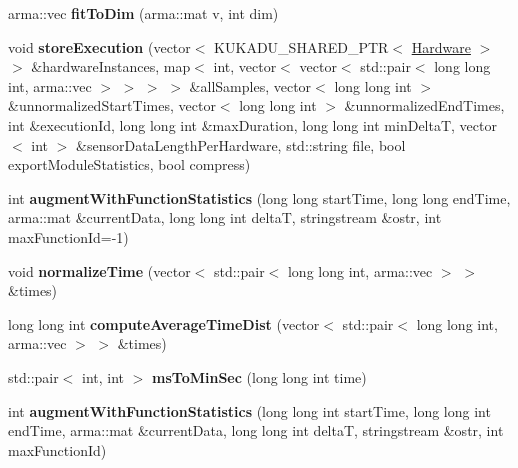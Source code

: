 \begin{DoxyCompactItemize}
\item 
arma\+::vec {\bfseries fit\+To\+Dim} (arma\+::mat v, int dim)\hypertarget{namespacekukadu_a5f6f7e69f2cdaa68555f7ed4783a5202}{}\label{namespacekukadu_a5f6f7e69f2cdaa68555f7ed4783a5202}

\item 
void {\bfseries store\+Execution} (vector$<$ K\+U\+K\+A\+D\+U\+\_\+\+S\+H\+A\+R\+E\+D\+\_\+\+P\+TR$<$ \hyperlink{classkukadu_1_1Hardware}{Hardware} $>$ $>$ \&hardware\+Instances, map$<$ int, vector$<$ vector$<$ std\+::pair$<$ long long int, arma\+::vec $>$ $>$ $>$ $>$ \&all\+Samples, vector$<$ long long int $>$ \&unnormalized\+Start\+Times, vector$<$ long long int $>$ \&unnormalized\+End\+Times, int \&execution\+Id, long long int \&max\+Duration, long long int min\+DeltaT, vector$<$ int $>$ \&sensor\+Data\+Length\+Per\+Hardware, std\+::string file, bool export\+Module\+Statistics, bool compress)\hypertarget{namespacekukadu_a7da4063c7c4cd7269933b7e80b5033cb}{}\label{namespacekukadu_a7da4063c7c4cd7269933b7e80b5033cb}

\item 
int {\bfseries augment\+With\+Function\+Statistics} (long long start\+Time, long long end\+Time, arma\+::mat \&current\+Data, long long int deltaT, stringstream \&ostr, int max\+Function\+Id=-\/1)\hypertarget{namespacekukadu_ae2a7dac6aa13b50ac97ce2cd34214362}{}\label{namespacekukadu_ae2a7dac6aa13b50ac97ce2cd34214362}

\item 
void {\bfseries normalize\+Time} (vector$<$ std\+::pair$<$ long long int, arma\+::vec $>$ $>$ \&times)\hypertarget{namespacekukadu_a0c363a082151911064bbd0c4a112bbc4}{}\label{namespacekukadu_a0c363a082151911064bbd0c4a112bbc4}

\item 
long long int {\bfseries compute\+Average\+Time\+Dist} (vector$<$ std\+::pair$<$ long long int, arma\+::vec $>$ $>$ \&times)\hypertarget{namespacekukadu_a4eed4286a6fb218c309d34381ca553a3}{}\label{namespacekukadu_a4eed4286a6fb218c309d34381ca553a3}

\item 
std\+::pair$<$ int, int $>$ {\bfseries ms\+To\+Min\+Sec} (long long int time)\hypertarget{namespacekukadu_a07941c44a11c11831024022d1e6b403c}{}\label{namespacekukadu_a07941c44a11c11831024022d1e6b403c}

\item 
int {\bfseries augment\+With\+Function\+Statistics} (long long int start\+Time, long long int end\+Time, arma\+::mat \&current\+Data, long long int deltaT, stringstream \&ostr, int max\+Function\+Id)\hypertarget{namespacekukadu_ab70ef28d7c0cbacbaae00f3bd617ac31}{}\label{namespacekukadu_ab70ef28d7c0cbacbaae00f3bd617ac31}


\end{DoxyCompactItemize}
